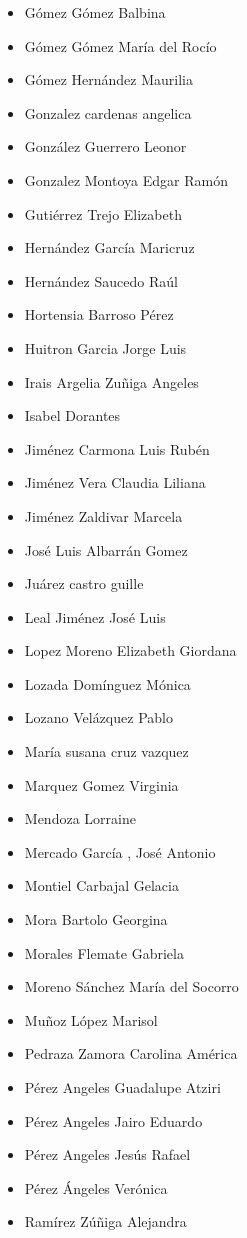 \begin{spacing}{0.5}
\begin{paracol}{2}
\begin{itemize}
\item Gómez Gómez Balbina
\item Gómez Gómez María del Rocío
\item Gómez Hernández Maurilia
\item Gonzalez cardenas angelica
\item González Guerrero Leonor
\item Gonzalez Montoya Edgar Ramón
\item Gutiérrez Trejo Elizabeth
\item Hernández García Maricruz
\item Hernández Saucedo Raúl
\item Hortensia Barroso Pérez
\item Huitron Garcia Jorge Luis
\item Irais Argelia Zuñiga Angeles
\item Isabel Dorantes
\item Jiménez Carmona Luis Rubén
\item Jiménez Vera Claudia Liliana
\item Jiménez Zaldivar Marcela
\item José Luis Albarrán Gomez
\item Juárez castro guille
\item Leal Jiménez José Luis
\item Lopez Moreno Elizabeth Giordana
\item Lozada Domínguez Mónica
\item Lozano Velázquez Pablo
\item María susana cruz vazquez
\item Marquez Gomez Virginia
\item Mendoza Lorraine
\item Mercado García , José Antonio
\item Montiel Carbajal Gelacia
\item Mora Bartolo Georgina
\item Morales Flemate Gabriela
\item Moreno Sánchez María del Socorro
\item Muñoz López Marisol
\item Pedraza Zamora Carolina América
\item Pérez Angeles Guadalupe Atziri
\item Pérez Angeles Jairo Eduardo
\item Pérez Angeles Jesús Rafael
\item Pérez Ángeles Verónica
\item Ramírez Zúñiga Alejandra

\end{itemize}
\end{paracol}
\end{spacing}
